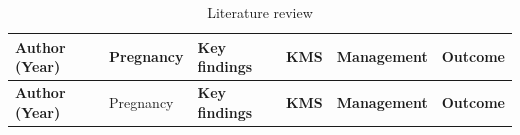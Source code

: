 \documentclass[
  letterpaper,
  DIV=11,
  numbers=noendperiod]{scrartcl}
\begin{document}
\begin{longtable}[]{@{}
  >{\raggedright\arraybackslash}p{}
  >{\raggedright\arraybackslash}p{}
  >{\raggedright\arraybackslash}p{}
  >{\raggedright\arraybackslash}p{}
  >{\raggedright\arraybackslash}p{}
  >{\raggedright\arraybackslash}p{}@{}}
\caption{Literature review}\tabularnewline
\toprule\noalign{}
\begin{minipage}[b]{\linewidth}\raggedright
\textbf{Author (Year)}
\end{minipage} & \begin{minipage}[b]{\linewidth}\raggedright
Pregnancy
\end{minipage} & \begin{minipage}[b]{\linewidth}\raggedright
\textbf{Key findings}
\end{minipage} & \begin{minipage}[b]{\linewidth}\raggedright
\textbf{KMS}
\end{minipage} & \begin{minipage}[b]{\linewidth}\raggedright
\textbf{Management}
\end{minipage} & \begin{minipage}[b]{\linewidth}\raggedright
\textbf{Outcome}
\end{minipage} \\
\midrule\noalign{}
\endfirsthead
\toprule\noalign{}
\begin{minipage}[b]{\linewidth}\raggedright
\textbf{Author (Year)}
\end{minipage} & \begin{minipage}[b]{\linewidth}\raggedright
Pregnancy
\end{minipage} & \begin{minipage}[b]{\linewidth}\raggedright
\textbf{Key findings}
\end{minipage} & \begin{minipage}[b]{\linewidth}\raggedright
\textbf{KMS}
\end{minipage} & \begin{minipage}[b]{\linewidth}\raggedright
\textbf{Management}
\end{minipage} & \begin{minipage}[b]{\linewidth}\raggedright
\textbf{Outcome}
\end{minipage} \\

\end{longtable}
\end{document}
